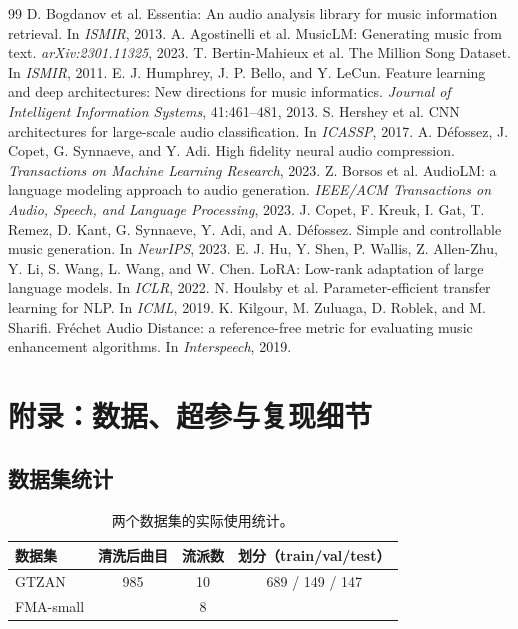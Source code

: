 \documentclass[UTF8,10pt,a4paper]{ctexart}
\begin{document}
\begin{thebibliography}{99}
 D. Bogdanov et al. Essentia: An audio analysis library for music information retrieval. In \emph{ISMIR}, 2013.
 A. Agostinelli et al. MusicLM: Generating music from text. \emph{arXiv:2301.11325}, 2023.
 T. Bertin-Mahieux et al. The Million Song Dataset. In \emph{ISMIR}, 2011.
 E. J. Humphrey, J. P. Bello, and Y. LeCun. Feature learning and deep architectures: New directions for music informatics. \emph{Journal of Intelligent Information Systems}, 41:461--481, 2013.
 S. Hershey et al. CNN architectures for large-scale audio classification. In \emph{ICASSP}, 2017.
 A. D\'efossez, J. Copet, G. Synnaeve, and Y. Adi. High fidelity neural audio compression. \emph{Transactions on Machine Learning Research}, 2023.
 Z. Borsos et al. AudioLM: a language modeling approach to audio generation. \emph{IEEE/ACM Transactions on Audio, Speech, and Language Processing}, 2023.
 J. Copet, F. Kreuk, I. Gat, T. Remez, D. Kant, G. Synnaeve, Y. Adi, and A. D\'efossez. Simple and controllable music generation. In \emph{NeurIPS}, 2023.
 E. J. Hu, Y. Shen, P. Wallis, Z. Allen-Zhu, Y. Li, S. Wang, L. Wang, and W. Chen. LoRA: Low-rank adaptation of large language models. In \emph{ICLR}, 2022.
 N. Houlsby et al. Parameter-efficient transfer learning for NLP. In \emph{ICML}, 2019.
 K. Kilgour, M. Zuluaga, D. Roblek, and M. Sharifi. Fr\'echet Audio Distance: a reference-free metric for evaluating music enhancement algorithms. In \emph{Interspeech}, 2019.
\end{thebibliography}

\appendix
\section{附录：数据、超参与复现细节}\label{sec:appendix}

\subsection{数据集统计}

\begin{table}[H]
\centering\small
\caption{两个数据集的实际使用统计。}
\label{tab:data}
\begin{tabular}{lccc}
\toprule
数据集 & 清洗后曲目 & 流派数 & 划分（train/val/test）\\
\midrule
GTZAN & 985 & 10 & 689 / 149 / 147\\
FMA-small &  & 8 & \\
\bottomrule
\end{tabular}
\end{table}
\end{document}
